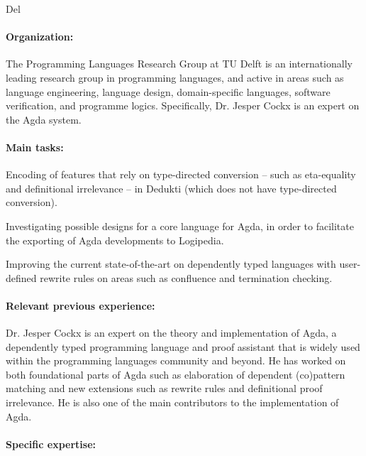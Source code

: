 \begin{sitedescription}{Del}

\paragraph{Organization:}
The Programming Languages Research Group at TU Delft is an
internationally leading research group in programming languages, and
active in areas such as language engineering, language design,
domain-specific languages, software verification, and programme logics.
Specifically, Dr. Jesper Cockx is an expert on the Agda system.

\paragraph{Main tasks:}

\begin{compactitem}
\item Encoding of features that rely on type-directed conversion --
  such as eta-equality and definitional irrelevance -- in Dedukti
  (which does not have type-directed conversion).
\item Investigating possible designs for a core language for Agda, in
  order to facilitate the exporting of Agda developments to Logipedia.
\item Improving the current state-of-the-art on dependently typed
  languages with user-defined rewrite rules on areas such as
  confluence and termination checking.
\end{compactitem}


\paragraph{Relevant previous experience:}

Dr. Jesper Cockx is an expert on the theory and implementation of
Agda, a dependently typed programming language and proof assistant
that is widely used within the programming languages community and
beyond. He has worked on both foundational parts of Agda such as
elaboration of dependent (co)pattern matching and new extensions such
as rewrite rules and definitional proof irrelevance. He is also one of
the main contributors to the implementation of Agda.
  
\paragraph{Specific expertise:}


\end{sitedescription}
